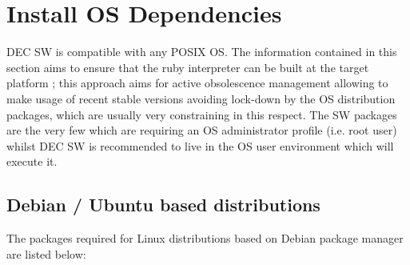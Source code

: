 \documentclass[dec_sum_main.tex]{subfiles}
\begin{document}
\section{Install OS Dependencies}
 DEC SW is compatible with any POSIX OS. The information contained in this section aims to ensure that the ruby interpreter can be built at the target platform ; this approach aims for active obsolescence management allowing to make usage of recent stable versions avoiding lock-down by the OS distribution packages, which are usually very constraining in this respect. The SW packages are the very few which are requiring an OS administrator profile (i.e. root user) whilst DEC SW is recommended to live in the OS user environment which will execute it.
 
 \subsection{Debian / Ubuntu based distributions}
 The packages required for Linux distributions based on Debian package manager are listed below:
 \par
 \noindent
   \newline
   \newline 
   \newline
   \newline
   \newline
   \newline
   \newline
   \newline
   \newline
   \newline
   \newline
   \newline
   \newline
   \newline
   \newline
   \newline
   \newline
\end{document}
